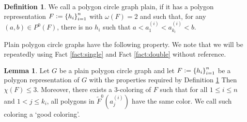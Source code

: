 \documentclass[12pt]{article}
\theoremstyle{definition}
\newtheorem{lemma}[thm]{Lemma}
\newtheorem{defn}[thm]{Definition}
\newcommand{\defeq}{\vcentcolon=}
\begin{document}
     \begin{defn} \label{def:plain}
         We call a polygon
         circle graph plain,
         if it has a
         polygon representation
         $F \defeq \left\{h_{i}\right\}_{i = 1}^{n}$ 
         with $\omega\left(F\right) = 2$
         and such that, 
         for any 
         $\left(a, b\right) \in 
         P^{0}\left(F\right)$,
         there is no $h_{i}$ 
         such that
         $a < a_1^{\left(i\right)} < 
         a_{k_{i}}^{\left(i\right)} <
         b$.
     \end{defn}

     Plain polygon
     circle graphs have the
     following property. 
     We note that we will
     be repeatedly using
     Fact \ref{fact:single}
     and Fact \ref{fact:double}
     without reference.

     \begin{lemma} \label{lemma:poly}
         Let $G$ be a plain polygon
         circle graph and
         let $F \defeq \left\{h_{i}\right\}_{i =1}^{n}$ 
         be a polygon representation of $G$ with
         the properties
         required by Definition
         \ref{def:plain}
         Then $\chi\left(F\right) \leq 3$.
         Moreover, there exists
         a 3-coloring of $F$ such
         that for all $1 \leq i \leq n$
         and $1 < j \leq k_{i}$,
         all polygons in
         $\widetilde{F}^{0}\left(a_{j}^{\left(i\right)}\right)$
         have the same color.
         We call such coloring a
         `good coloring'.
     \end{lemma}
\end{document}
